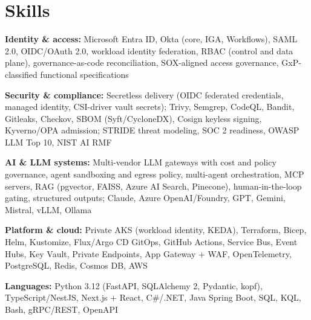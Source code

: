 \documentclass[10pt,letterpaper]{article}
\newcommand{\szmeta}{\fontsize{8pt}{10pt}\selectfont}
\begin{document}
\section*{Skills}
{\szmeta \textbf{Identity \& access:} Microsoft Entra ID, Okta (core, IGA, Workflows), SAML 2.0, OIDC/OAuth 2.0, workload identity federation, RBAC (control and data plane), governance-as-code reconciliation, SOX-aligned access governance, GxP-classified functional specifications\par\vspace{2pt}\textbf{Security \& compliance:} Secretless delivery (OIDC federated credentials, managed identity, CSI-driver vault secrets); Trivy, Semgrep, CodeQL, Bandit, Gitleaks, Checkov, SBOM (Syft/CycloneDX), Cosign keyless signing, Kyverno/OPA admission; STRIDE threat modeling, SOC 2 readiness, OWASP LLM Top 10, NIST AI RMF\par\vspace{2pt}\textbf{AI \& LLM systems:} Multi-vendor LLM gateways with cost and policy governance, agent sandboxing and egress policy, multi-agent orchestration, MCP servers, RAG (pgvector, FAISS, Azure AI Search, Pinecone), human-in-the-loop gating, structured outputs; Claude, Azure OpenAI/Foundry, GPT, Gemini, Mistral, vLLM, Ollama\par\vspace{2pt}\textbf{Platform \& cloud:} Private AKS (workload identity, KEDA), Terraform, Bicep, Helm, Kustomize, Flux/Argo CD GitOps, GitHub Actions, Service Bus, Event Hubs, Key Vault, Private Endpoints, App Gateway + WAF, OpenTelemetry, PostgreSQL, Redis, Cosmos DB, AWS\par\vspace{2pt}\textbf{Languages:} Python 3.12 (FastAPI, SQLAlchemy 2, Pydantic, kopf), TypeScript/NestJS, Next.js + React, C\#/.NET, Java Spring Boot, SQL, KQL, Bash, gRPC/REST, OpenAPI}\par
\end{document}

